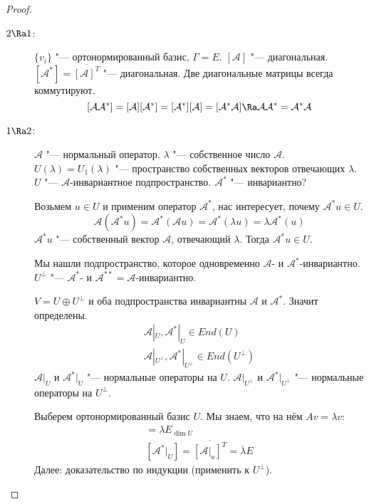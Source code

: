 \begin{proof}
	\begin{description}
	\item[$2 \Ra 1$:]
		$\{v_i\}$ "--- ортонормированный базис, $\Gamma = E$.
		$[\mathcal A] $ "--- диагональная.
		$[\mathcal{A}^*] = \overline{[\mathcal A]^T}$ "--- диагональная.
		Две диагональные матрицы всегда коммутируют.
		\[
			[\mathcal A\mathcal{A}^*]
			= [\mathcal A][\mathcal{A}^*]
			= [\mathcal{A}^*][\mathcal A]
			= [\mathcal{A}^*\mathcal A]
			\Ra \mathcal A\mathcal{A}^*
			= \mathcal{A}^*\mathcal A
		\]

	\item[$1 \Ra 2$:]
		$\mathcal A$ "--- нормальный оператор.
		$\lambda$ "--- собственное число $\mathcal A$.
		$U(\lambda) = U_1(\lambda)$ "--- пространство собственных векторов отвечающих $\lambda$.
		$U$ "--- $\mathcal A$-инвариантное подпространство.
		$\mathcal{A}^*$ "--- инвариантно?

		Возьмем $u \in U$ и применим оператор $\mathcal{A}^*$, нас интересует, почему $\mathcal{A}^*u \in U$.
		\[ \mathcal A(\mathcal{A}^*u) = \mathcal{A}^*(\mathcal Au) = \mathcal{A}^*(\lambda u) = \lambda \mathcal{A}^*(u) \]
		$\mathcal{A}^*u$ "--- собственный вектор $\mathcal A$, отвечающий $\lambda$.
		Тогда $\mathcal{A}^*u \in U$.

		Мы нашли подпространство, которое одновременно $\mathcal A$- и $\mathcal{A}^*$-инвариантно.
		$U^{\bot}$ "--- $\mathcal{A}^*$- и $\mathcal{A}^{**} = \mathcal A$-инвариантно.

		$V = U \oplus U^{\bot}$ и оба подпространства инвариантны $\mathcal A$ и $\mathcal{A}^*$.
		Значит определены.
		\begin{gather*}
			\mathcal A|_U, \mathcal{A}^*|_U \in End(U) \\
			\mathcal A|_{U^{\bot}}, \mathcal{A}^*|_{U^{\bot}} \in End(U^{\bot})
		\end{gather*}
		$\mathcal A|_U$ и $\mathcal{A}^*|_U$ "--- нормальные операторы на $U$.
		$\mathcal A|_{U^{\bot}}$ и $\mathcal{A}^*|_{U^{\bot}}$ "--- нормальные операторы на $U^{\bot}$.

		Выберем ортонормированный базис $U$.
		Мы знаем, что на нём $Av = \lambda v$:
		\begin{gather*}
			[\mathcal A|_U] = \lambda E_{\dim U} \\
			[\mathcal{A}^*|_U] = \overline{[\mathcal A|_u]^T} = \overline{\lambda}E
		\end{gather*}
		Далее: доказательство по индукции (применить к $U^{\bot}$).
	\end{description}
\end{proof}

